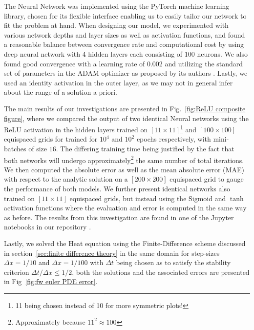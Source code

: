 \documentclass[reprint, english, nofootinbib]{revtex4-2}
\begin{document}
The Neural Network was implemented using the PyTorch \cite{NEURIPS2019_9015} machine learning library, chosen for its flexible interface enabling us to easily tailor our network to fit the problem at hand. When designing our model, we experimented with various network depths and layer sizes as well as activation functions, and found a reasonable balance between convergence rate and computational cost by using deep neural network with 4 hidden layers each consisting of 100 neurons. We also found good convergence with a learning rate of 0.002 and utilizing the standard set of parameters in the ADAM optimizer as proposed by its authors \textcite{kingma2017adam}. Lastly, we used an identity activation in the outer layer, as we may not in general infer about the range of a solution a priori. 

The main results of our investigations are presented in Fig.~\ref{fig:ReLU composite figure}, where we compared the output of two identical Neural networks using the ReLU activation in the hidden layers trained on $[11\times11]$\footnote{11 being chosen instead of 10 for more symmetric plots!} and $[100\times100]$ equispaced grids for trained for $10^4$ and $10^2$ epochs respectively, with mini-batches of size $16$. The differing training time being justified by the fact that both networks will undergo approximately\footnote{Approximately because $11^2 \approx 100$} the same number of total iterations. We then computed the absolute error as well as the mean absolute error (MAE) with respect to the analytic solution on a $[200\times200]$ equispaced grid to gauge the performance of both models. We further present identical networks also trained on $[11\times11]$ equispaced grids, but instead using the Sigmoid and $\tanh$ activation functions where the evaluation and error is computed in the same way as before. The results from this investigation are found in one of the Jupyter notebooks in our repository \cite{github_repo}.

Lastly, we solved the Heat equation using the Finite-Difference scheme discussed in section~\ref{sec:finite difference theory} in the same domain for step-sizes $\Delta x = 1/10$ and $\Delta x = 1/100$ with $\Delta t$ being chosen as to satisfy the stability criterion $\Delta t / \Delta x \leq 1/2$, both the solutions and the associated errors are presented in Fig~\ref{fig:fw euler PDE error}.
\end{document}
